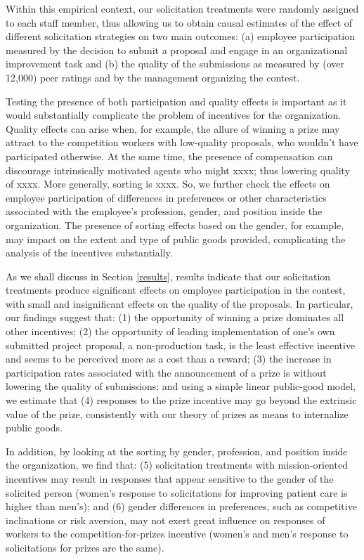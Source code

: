 \documentclass[12pt, titlepage]{article}
\begin{document}
Within this empirical context, our solicitation treatments were randomly
assigned to each staff member, thus allowing us to obtain causal
estimates of the effect of different solicitation strategies on two main
outcomes: (a) employee participation measured by the decision to submit
a proposal and engage in an organizational improvement task and (b) the
quality of the submissions as measured by (over 12,000) peer ratings and
by the management organizing the contest.

Testing the presence of both participation and quality effects is
important as it would substantially complicate the problem of incentives
for the organization. Quality effects can arise when, for example, the
allure of winning a prize may attract to the competition workers with
low-quality proposals, who wouldn't have participated otherwise. At the
same time, the presence of compensation can discourage intrinsically
motivated agents who might xxxx; thus lowering quality of xxxx. More
generally, sorting is xxxx. So, we further check the effects on employee
participation of differences in preferences or other characteristics
associated with the employee's profession, gender, and position inside
the organization. The presence of sorting effects based on the gender,
for example, may impact on the extent and type of public goods provided,
complicating the analysis of the incentives substantially.

As we shall discuss in Section \ref{results}, results indicate that our
solicitation treatments produce significant effects on employee
participation in the contest, with small and insignificant effects on
the quality of the proposals. In particular, our findings suggest that:
(1) the opportunity of winning a prize dominates all other incentives;
(2) the opportunity of leading implementation of one's own submitted
project proposal, a non-production task, is the least effective
incentive and seems to be perceived more as a cost than a reward; (3)
the increase in participation rates associated with the announcement of
a prize is without lowering the quality of submissions; and using a
simple linear public-good model, we estimate that (4) responses to the
prize incentive may go beyond the extrinsic value of the prize,
consistently with our theory of prizes as means to internalize public
goods.

In addition, by looking at the sorting by gender, profession, and
position inside the organization, we find that: (5) solicitation
treatments with mission-oriented incentives may result in responses that
appear sensitive to the gender of the solicited person (women's response
to solicitations for improving patient care is higher than men's); and
(6) gender differences in preferences, such as competitive inclinations
or risk aversion, may not exert great influence on responses of workers
to the competition-for-prizes incentive (women's and men's response to
solicitations for prizes are the same).
\end{document}
